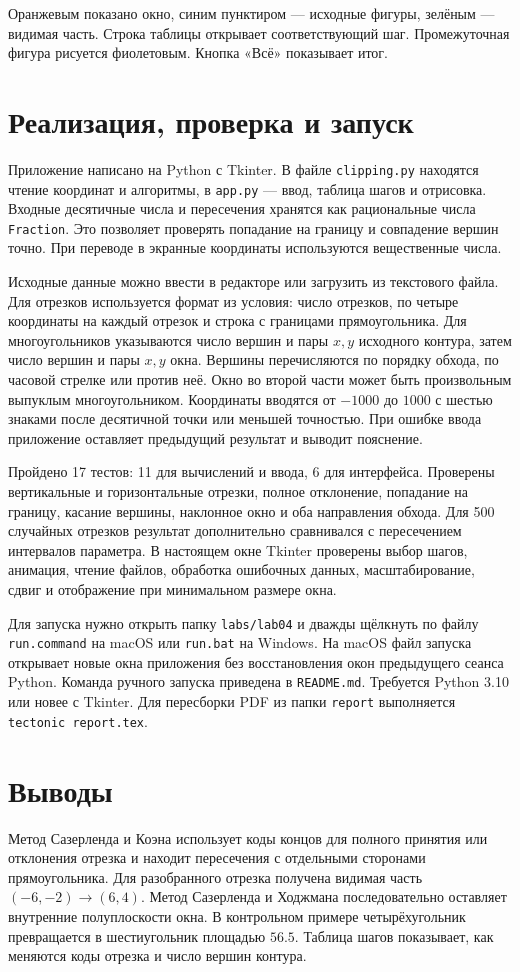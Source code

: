 \documentclass[12pt,a4paper]{extarticle}
\newcommand{\code}[1]{\texttt{\small #1}}
\begin{document}
Оранжевым показано окно, синим пунктиром --- исходные фигуры, зелёным --- видимая часть. Строка таблицы открывает соответствующий шаг. Промежуточная фигура рисуется фиолетовым. Кнопка «Всё» показывает итог.

\clearpage
\section{Реализация, проверка и запуск}
Приложение написано на Python с Tkinter. В файле \code{clipping.py} находятся чтение координат и алгоритмы, в \code{app.py} --- ввод, таблица шагов и отрисовка. Входные десятичные числа и пересечения хранятся как рациональные числа \code{Fraction}. Это позволяет проверять попадание на границу и совпадение вершин точно. При переводе в экранные координаты используются вещественные числа.

Исходные данные можно ввести в редакторе или загрузить из текстового файла. Для отрезков используется формат из условия: число отрезков, по четыре координаты на каждый отрезок и строка с границами прямоугольника. Для многоугольников указываются число вершин и пары $x,y$ исходного контура, затем число вершин и пары $x,y$ окна. Вершины перечисляются по порядку обхода, по часовой стрелке или против неё. Окно во второй части может быть произвольным выпуклым многоугольником. Координаты вводятся от $-1000$ до $1000$ с шестью знаками после десятичной точки или меньшей точностью. При ошибке ввода приложение оставляет предыдущий результат и выводит пояснение.

Пройдено 17 тестов: 11 для вычислений и ввода, 6 для интерфейса. Проверены вертикальные и горизонтальные отрезки, полное отклонение, попадание на границу, касание вершины, наклонное окно и оба направления обхода. Для 500 случайных отрезков результат дополнительно сравнивался с пересечением интервалов параметра. В настоящем окне Tkinter проверены выбор шагов, анимация, чтение файлов, обработка ошибочных данных, масштабирование, сдвиг и отображение при минимальном размере окна.

Для запуска нужно открыть папку \code{labs/lab04} и дважды щёлкнуть по файлу \code{run.command} на macOS или \code{run.bat} на Windows. На macOS файл запуска открывает новые окна приложения без восстановления окон предыдущего сеанса Python. Команда ручного запуска приведена в \code{README.md}. Требуется Python 3.10 или новее с Tkinter. Для пересборки PDF из папки \code{report} выполняется \code{tectonic report.tex}.

\section{Выводы}
Метод Сазерленда и Коэна использует коды концов для полного принятия или отклонения отрезка и находит пересечения с отдельными сторонами прямоугольника. Для разобранного отрезка получена видимая часть $(-6,-2)\to(6,4)$. Метод Сазерленда и Ходжмана последовательно оставляет внутренние полуплоскости окна. В контрольном примере четырёхугольник превращается в шестиугольник площадью $56.5$. Таблица шагов показывает, как меняются коды отрезка и число вершин контура.
\end{document}
